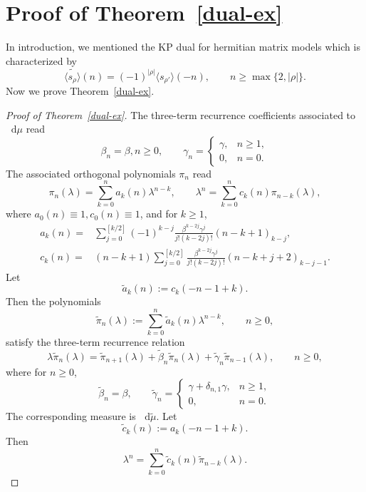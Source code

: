 \documentclass[a4paper]{article}
\theoremstyle{plain}
\theoremstyle{definition}
\newcommand{\dif}{\mathop{}\!\mathrm{d}}
\begin{document}
\section{Proof of Theorem~\ref{dual-ex}} \label{sec-dual}

In introduction, we mentioned the KP dual for hermitian matrix models which is characterized by
\begin{equation}
	\widetilde{\langle s_\rho\rangle}(n)=(-1)^{|\rho|}\langle s_{\rho'}\rangle(-n),\qquad n\ge\max\{2,|\rho|\}.
\end{equation}
Now we prove Theorem~\ref{dual-ex}.

\begin{proof}[Proof of Theorem~\ref{dual-ex}]
	The three-term recurrence coefficients associated to $\dif\mu$ read
	\begin{equation}
		\beta_n=\beta,n\ge0,\qquad\gamma_n=\begin{cases}
			\gamma,&n\ge1,\\
			0,&n=0.
		\end{cases}
	\end{equation}
	The associated orthogonal polynomials $\pi_n$ read
	\begin{equation}
		\pi_n(\lambda)=\sum_{k=0}^na_k(n)\lambda^{n-k},\qquad\lambda^n=\sum_{k=0}^nc_k(n)\pi_{n-k}(\lambda),
	\end{equation}
	where $a_0(n)\equiv1,c_0(n)\equiv1$, and for $k\ge1$,
	\begin{align}
		a_k(n)=&\sum_{j=0}^{[k/2]}(-1)^{k-j}\frac{\beta^{k-2j}\gamma^j}{j!(k-2j)!}(n-k+1)_{k-j}, \label{ak}\\
		c_k(n)=&(n-k+1)\sum_{j=0}^{[k/2]}\frac{\beta^{k-2j}\gamma^j}{j!(k-2j)!}(n-k+j+2)_{k-j-1}.
	\end{align}
	Let
	\begin{equation}
		\widetilde a_k(n):=c_k(-n-1+k).
	\end{equation}
	Then the polynomials
	\begin{equation}
		\widetilde\pi_n(\lambda):=\sum_{k=0}^n\widetilde a_k(n)\lambda^{n-k},\qquad n\ge0,
	\end{equation} satisfy the three-term recurrence relation
	\begin{equation}
		\lambda\widetilde\pi_n(\lambda)=\widetilde\pi_{n+1}(\lambda)+\widetilde\beta_n\widetilde\pi_n(\lambda)+\widetilde\gamma_n\widetilde\pi_{n-1}(\lambda),\qquad n\ge0,
	\end{equation}
	where for $n\ge0$,
	\begin{equation}
		\widetilde\beta_n=\beta,\qquad\widetilde\gamma_n=\begin{cases}
			\gamma+\delta_{n,1}\gamma,&n\ge1,\\
			0,&n=0.
		\end{cases}
	\end{equation}
	The corresponding measure is $\dif\widetilde\mu$.
	Let
	\begin{equation}
		\widetilde c_k(n):=a_k(-n-1+k).
	\end{equation}
	Then
	\begin{equation}
		\lambda^n=\sum_{k=0}^n\widetilde c_k(n)\widetilde\pi_{n-k}(\lambda).
	\end{equation}


\end{proof}
\end{document}

